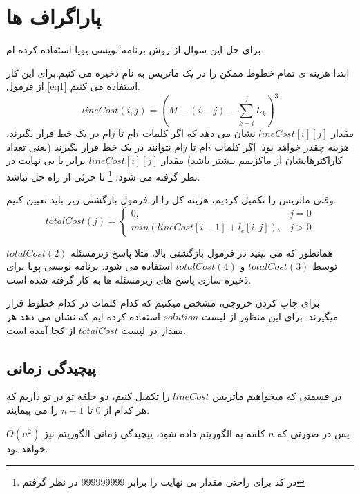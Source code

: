 \documentclass[12pt]{article}
\begin{document}
\section*{پاراگراف ها}

برای حل این سوال از روش برنامه نویسی پویا
استفاده کرده ام. 

ابتدا هزینه ی تمام خطوط ممکن را در یک ماتریس به نام
ذخیره می کنیم.برای این کار از فرمول 
\ref{eq1}
استفاده می کنیم.
\begin{equation}
lineCost(i,j)=(M-(i-j)-\sum_{k=i}^j L_k)^3
\label{eq1}
\end{equation}
 مقدار
$lineCost[i][j]$
نشان می دهد که اگر کلمات $i$ام تا $j$ام در یک خط قرار بگیرند، هزینه چقدر خواهد بود. اگر کلمات $i$ام تا $j$ام نتوانند در یک خط قرار بگیرند (یعنی تعداد کاراکترهایشان از ماکزیمم بیشتر باشد) مقدار
$lineCost[i][j]$
برابر با بی نهایت در نظر گرفته می شود،
\footnote{در کد برای راحتی مقدار بی نهایت را برابر 999999999 در نظر گرفتم}
تا جزئی از راه حل نباشد.

وقتی ماتریس 
را تکمیل کردیم، هزینه کل را از فرمول بازگشتی زیر باید تعیین کنیم.
\[
    totalCost(j)= 
\begin{cases}
    0,& j = 0\\
    min(lineCost[i-1]+l_c[i,j]),              & j>0
\end{cases}
\]

همانطور که می بینید در فرمول بازگشتی بالا، مثلا پاسخ زیرمسئله 
$totalCost(2)$
توسط 
$totalCost(3)$
و
$totalCost(4)$
استفاده می شود. برنامه نویسی پویا برای ذخیره سازی پاسخ های زیرمسئله ها به کار گرفته شده است.

برای چاپ کردن خروجی، مشخص میکنیم که کدام کلمات در کدام خطوط قرار میگیرند. برای این منظور از لیست 
$solution$
استفاده کرده ایم که نشان می دهد هر مقدار در لیست 
$totalCost$
از کجا آمده است. 

\subsection*{پیچیدگی زمانی}
در قسمتی که میخواهیم ماتریس 
$lineCost$
را تکمیل کنیم، دو حلقه تو در تو داریم که هر کدام از $0$ تا $n+1$ را می پیمایند.

پس در صورتی که $n$ کلمه به الگوریتم داده شود، پیچیدگی زمانی الگوریتم نیز 
$O(n^2)$
خواهد بود.
\end{document}
